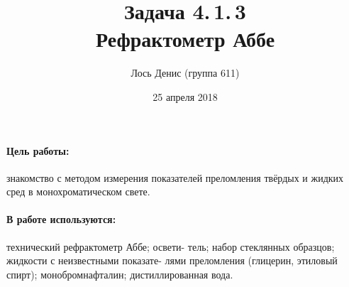 \documentclass[12pt]{article}
\title{{\bf Задача 4.\,1.\,3 \\ Рефрактометр Аббе}}
\author{Лось Денис (группа 611)}
\date{25 апреля 2018}
\begin{document}
\maketitle

\paragraph*{Цель работы: } знакомство с методом измерения показателей преломления твёрдых и жидких сред в монохроматическом свете.

\paragraph*{В работе используются: } технический рефрактометр Аббе; освети-
тель; набор стеклянных образцов; жидкости с неизвестными показате-
лями преломления (глицерин, этиловый спирт); монобромнафталин;
дистиллированная вода.
\end{document}
